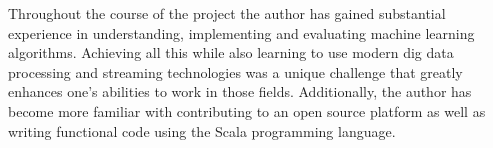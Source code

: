 \documentclass{l4proj}
\begin{document}
Throughout the course of the project the author has gained substantial experience in understanding, implementing and evaluating machine learning algorithms. Achieving all this while also learning to use modern dig data processing and streaming technologies was a unique challenge that greatly enhances one's abilities to work in those fields. Additionally, the author has become more familiar with  contributing to an open source platform as well as writing functional code using the Scala programming language.






\end{document}
